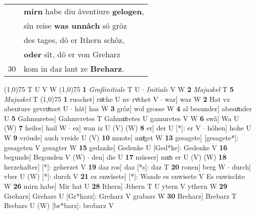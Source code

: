 \documentclass[8pt,a4paper,notitlepage]{article}
\begin{document}
\begin{table}[ht]
\begin{minipage}[t]{0.5\linewidth}
\begin{tabular}{rl}
 & \textbf{mir}\textbf{n} habe diu âventiure \textbf{gelogen},\\ 
 & sîn reise \textbf{was unnâch} sô grôz\\ 
 & des tages, dô er Ithern schôz,\\ 
 & \textbf{oder} sît, dô er von Greharz\\ 
30 & kom in daz lant ze \textbf{Breharz}.\\ 
\end{tabular}
\scriptsize
\line(1,0){75} \newline
T U V W \newline
\line(1,0){75} \newline
\textbf{1} \textit{Großinitiale} T U   $\cdot$ \textit{Initiale} V W  \textbf{2} \textit{Majuskel} T  \textbf{5} \textit{Majuskel} T  \newline
\line(1,0){75} \newline
\textbf{1} ruochet] ruͦche U nv rvͦchet V  $\cdot$ war] waz W \textbf{2} Hat vz abenture gevruͦmet U  $\cdot$ hât] has W \textbf{3} grôz] wol grosse W \textbf{4} al besunder] abesuͦnder U \textbf{5} Gahmuretes] Gahmvretes T Gahmuͦretes U gamuretes V W \textbf{6} swâ] Wa U (W) \textbf{7} heiles] hail W  $\cdot$ ez] wan iz U (V) (W) \textbf{8} er] der U [*]: er V  $\cdot$ hôhen] hohe U W \textbf{9} vröude] auch vreide U (V) \textbf{10} muote] muͤget W \textbf{13} gesagete] [gesagete*]: gesageten V gesagter W \textbf{15} gedanke] Gedenke U [Ged*ke]: Gedenke V \textbf{16} begunde] Begonden V (W)  $\cdot$ den] die U \textbf{17} müeser] muͦz er U (V) (W) \textbf{18} herzehafter] [*]: geherzet V \textbf{19} daz ros] daz [*s]: daz T \textbf{20} ronen] berg W  $\cdot$ durch] vber U (W) [*]: durch  V \textbf{21} ez enwîsete] [*]: Wande es enwisete V Es enwischte W \textbf{26} mirn habe] Mir hat U \textbf{28} Ithern] Jthern T U ytern V ythern W \textbf{29} Greharz] Grehars U [Gr*harz]: Greharz V grabars W \textbf{30} Breharz] Brebarz T Brebars U (W) [br*barz]: brobarz  V \newline
\end{minipage}
\end{table}
\end{document}

